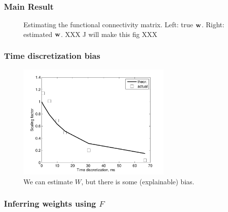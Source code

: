 \clearpage
\subsubsection{Main Result}

\begin{figure}[h]
\caption{Estimating the functional connectivity matrix. Left: true $\mathbf{w}$.  Right: estimated $\mathbf{w}$.  XXX J will make this fig XXX}
\label{fig:w}
\end{figure}

\clearpage
\subsubsection{Time discretization bias}

\begin{figure}[h]
\centering
\includegraphics[width=3in]{../figs/Figure13_scalebiasvsframerate}
\caption{We can estimate $W$, but there is some (explainable) bias.}
\label{fig:bias}
\end{figure}

\clearpage
\subsubsection{Inferring weights using $F$}

